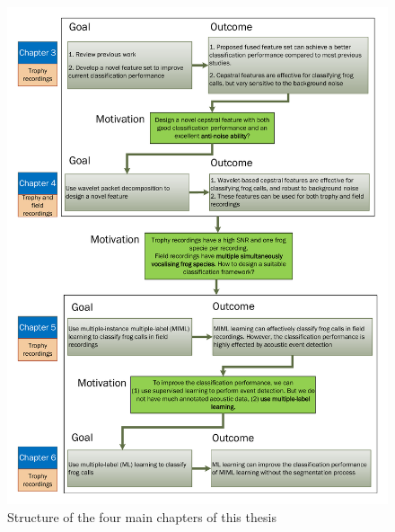 \begin{figure}[htb!]
\centering
\includegraphics[width=\textwidth]{image/Ch1/structure_chapters.pdf}
\caption[Logic structure of the four experimental chapters of this thesis]{Structure of the four main chapters of this thesis}
\label{fig:mainchapters}
\end{figure}








